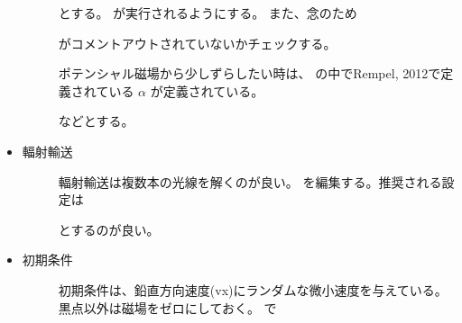 \documentclass[letterpaper,10pt,dvipdfmx,report]{sphinxmanual}
\begin{document}
\begin{itemize}
\begin{description}
とする。  が実行されるようにする。
また、念のため

\begin{sphinxVerbatim}[commandchars=\\\{\}]
\end{sphinxVerbatim}

がコメントアウトされていないかチェックする。

ポテンシャル磁場から少しずらしたい時は、  の中でRempel, 2012で定義されている \(\alpha\) が定義されている。

\begin{sphinxVerbatim}[commandchars=\\\{\}]
     
\end{sphinxVerbatim}

などとする。

\end{description}

\item {} \begin{description}
\item[{輻射輸送}] \leavevmode
輻射輸送は複数本の光線を解くのが良い。
 を編集する。推奨される設定は

\begin{sphinxVerbatim}[commandchars=\\\{\}]
     
     
     
\end{sphinxVerbatim}

とするのが良い。

\end{description}

\item {} \begin{description}
\item[{初期条件}] \leavevmode
初期条件は、鉛直方向速度(vx)にランダムな微小速度を与えている。
黒点以外は磁場をゼロにしておく。
 で


\end{description}
\end{itemize}
\end{document}
